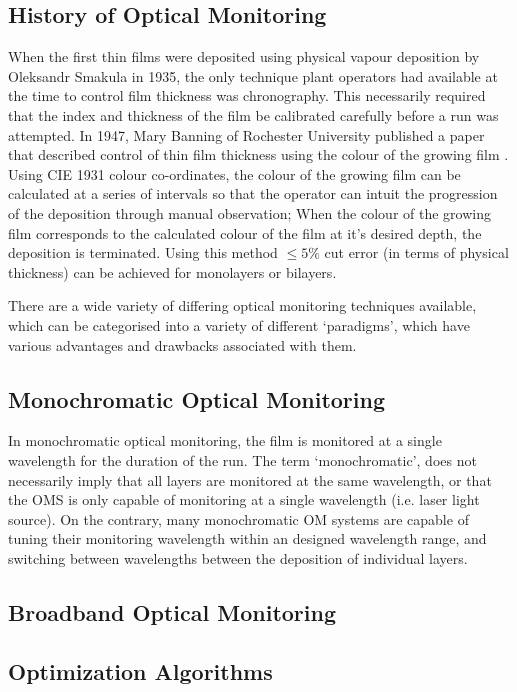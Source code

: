 \documentclass[10pt,a4paper,portrait]{report}
\begin{document}
\subsection{History of Optical Monitoring}
When the first thin films were deposited using physical vapour deposition by Oleksandr Smakula in 1935, the only technique plant operators had available at the time to control film thickness was chronography.
This necessarily required that the index and thickness of the film be calibrated carefully before a run was attempted.
In 1947, Mary Banning of Rochester University published a paper that described control of thin film thickness using the colour of the growing film \cite{banning_practical_1947}. Using CIE 1931 colour co-ordinates, the colour of the growing film can be calculated at a series of intervals so that the operator can intuit the progression of the deposition through manual observation;
When the colour of the growing film corresponds to the calculated colour of the film at it's desired depth, the deposition is terminated.
Using this method  $\leq5\%$ cut error (in terms of physical thickness) can be achieved for monolayers or bilayers.


There are a wide variety of differing optical monitoring techniques available, which can be categorised into a variety of different `paradigms', which have various advantages and drawbacks associated with them. 


\subsection{Monochromatic Optical Monitoring}

In monochromatic optical monitoring, the film is monitored at a single wavelength for the duration of the run. The term `monochromatic', does not necessarily imply that all layers are monitored at the same wavelength, or that the OMS is only capable of monitoring at a single wavelength (i.e. laser light source).
On the contrary, many monochromatic OM systems are capable of tuning their monitoring wavelength within an designed wavelength range, and switching between wavelengths between the deposition of individual layers. 

\subsection{Broadband Optical Monitoring}
\subsection{Optimization Algorithms}
\end{document}
